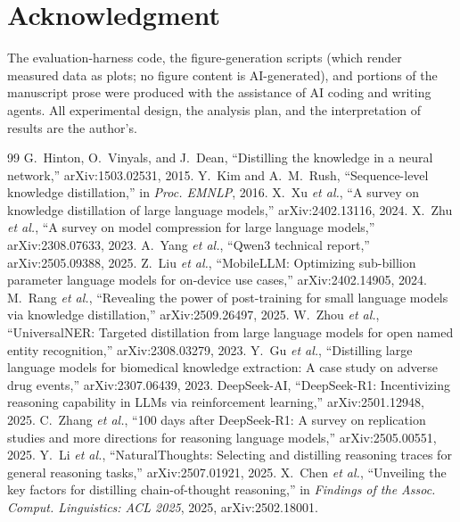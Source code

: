 \documentclass[10pt,journal]{IEEEtran}
\begin{document}
\section*{Acknowledgment}
The evaluation-harness code, the figure-generation scripts (which render measured data as plots; no figure content is AI-generated), and portions of the manuscript prose were produced with the assistance of AI coding and writing agents. All experimental design, the analysis plan, and the interpretation of results are the author's.

\begin{thebibliography}{99}
 G.~Hinton, O.~Vinyals, and J.~Dean, ``Distilling the knowledge in a neural network,'' arXiv:1503.02531, 2015.
 Y.~Kim and A.~M.~Rush, ``Sequence-level knowledge distillation,'' in \emph{Proc. EMNLP}, 2016.
 X.~Xu \emph{et al.}, ``A survey on knowledge distillation of large language models,'' arXiv:2402.13116, 2024.
 X.~Zhu \emph{et al.}, ``A survey on model compression for large language models,'' arXiv:2308.07633, 2023.
 A.~Yang \emph{et al.}, ``Qwen3 technical report,'' arXiv:2505.09388, 2025.
 Z.~Liu \emph{et al.}, ``MobileLLM: Optimizing sub-billion parameter language models for on-device use cases,'' arXiv:2402.14905, 2024.
 M.~Rang \emph{et al.}, ``Revealing the power of post-training for small language models via knowledge distillation,'' arXiv:2509.26497, 2025.
 W.~Zhou \emph{et al.}, ``UniversalNER: Targeted distillation from large language models for open named entity recognition,'' arXiv:2308.03279, 2023.
 Y.~Gu \emph{et al.}, ``Distilling large language models for biomedical knowledge extraction: A case study on adverse drug events,'' arXiv:2307.06439, 2023.
 DeepSeek-AI, ``DeepSeek-R1: Incentivizing reasoning capability in LLMs via reinforcement learning,'' arXiv:2501.12948, 2025.
 C.~Zhang \emph{et al.}, ``100 days after DeepSeek-R1: A survey on replication studies and more directions for reasoning language models,'' arXiv:2505.00551, 2025.
 Y.~Li \emph{et al.}, ``NaturalThoughts: Selecting and distilling reasoning traces for general reasoning tasks,'' arXiv:2507.01921, 2025.
 X.~Chen \emph{et al.}, ``Unveiling the key factors for distilling chain-of-thought reasoning,'' in \emph{Findings of the Assoc. Comput. Linguistics: ACL 2025}, 2025, arXiv:2502.18001.

\end{thebibliography}
\end{document}
